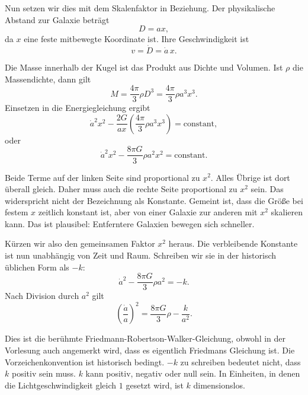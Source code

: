 Nun setzen wir dies mit dem Skalenfaktor in Beziehung. Der physikalische Abstand zur Galaxie beträgt
\begin{equation}
D=ax,
\end{equation}
da \(x\) eine feste mitbewegte Koordinate ist. Ihre Geschwindigkeit ist
\begin{equation}
v=\dot D=\dot a\,x.
\end{equation}

Die Masse innerhalb der Kugel ist das Produkt aus Dichte und Volumen. Ist \(\rho\) die Massendichte, dann gilt
\begin{equation}
M=\frac{4\pi}{3}\rho D^3=\frac{4\pi}{3}\rho a^3x^3.
\end{equation}
Einsetzen in die Energiegleichung ergibt
\begin{equation}
\dot a^2x^2-\frac{2G}{ax}\left(\frac{4\pi}{3}\rho a^3x^3\right)=\text{constant},
\end{equation}
oder
\begin{equation}
\dot a^2x^2-\frac{8\pi G}{3}\rho a^2x^2=\text{constant}.
\end{equation}

Beide Terme auf der linken Seite sind proportional zu \(x^2\). Alles Übrige ist dort überall gleich. Daher muss auch die rechte Seite proportional zu \(x^2\) sein. Das widerspricht nicht der Bezeichnung als Konstante. Gemeint ist, dass die Größe bei festem \(x\) zeitlich konstant ist, aber von einer Galaxie zur anderen mit \(x^2\) skalieren kann. Das ist plausibel: Entferntere Galaxien bewegen sich schneller.

Kürzen wir also den gemeinsamen Faktor \(x^2\) heraus. Die verbleibende Konstante ist nun unabhängig von Zeit und Raum. Schreiben wir sie in der historisch üblichen Form als \(-k\):
\begin{equation}
\dot a^2-\frac{8\pi G}{3}\rho a^2=-k.
\end{equation}
Nach Division durch \(a^2\) gilt
\begin{equation}
\left(\frac{\dot a}{a}\right)^2=\frac{8\pi G}{3}\rho-\frac{k}{a^2}.
\end{equation}

Dies ist die berühmte Friedmann-Robertson-Walker-Gleichung, obwohl in der Vorlesung auch angemerkt wird, dass es eigentlich Friedmans Gleichung ist. Die Vorzeichenkonvention ist historisch bedingt. \(-k\) zu schreiben bedeutet nicht, dass \(k\) positiv sein muss. \(k\) kann positiv, negativ oder null sein. In Einheiten, in denen die Lichtgeschwindigkeit gleich \(1\) gesetzt wird, ist \(k\) dimensionslos.

